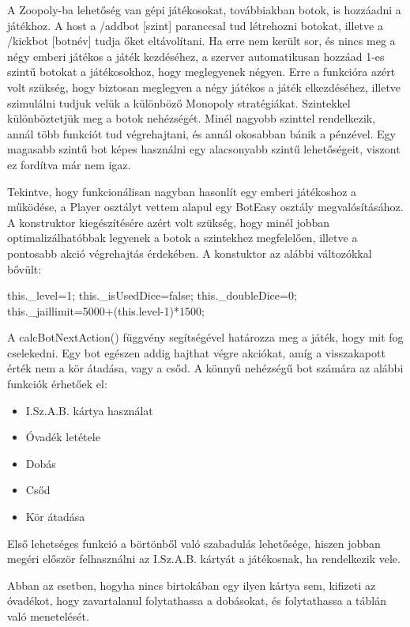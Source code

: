 
A Zoopoly-ba lehetőség van gépi játékosokat, továbbiakban botok, is hozzáadni a játékhoz. A host a /addbot [szint] paranccsal tud létrehozni botokat, illetve a /kickbot [botnév] tudja őket eltávolítani. Ha erre nem került sor, és nincs meg a négy emberi játékos a játék kezdéséhez, a szerver automatikusan hozzáad 1-es szintű botokat a játékosokhoz, hogy meglegyenek négyen. Erre a funkcióra azért volt szükség, hogy biztosan meglegyen a négy játékos a játék elkezdéséhez, illetve szimulálni tudjuk velük a különböző Monopoly stratégiákat. Szintekkel különböztetjük meg a botok nehézségét. Minél nagyobb szinttel rendelkezik, annál több funkciót tud végrehajtani, és annál okosabban bánik a pénzével. Egy magasabb szintű bot képes használni egy alacsonyabb szintű lehetőségeit, viszont ez fordítva már nem igaz.


Tekintve, hogy funkcionálisan nagyban hasonlít egy emberi játékoshoz a működése, a Player osztályt vettem alapul egy BotEasy osztály megvalósításához. A konstruktor kiegészítésére azért volt szükség, hogy minél jobban optimalizálhatóbbak legyenek a botok a szintekhez megfelelően, illetve a pontosabb akció végrehajtás érdekében.  A konstuktor az alábbi változókkal bővült:

\begin{javascript}
	this._level=1;
        this._isUsedDice=false;
        this._doubleDice=0;
        this._jaillimit=5000+(this.level-1)*1500;
\end{javascript}

A calcBotNextAction() függvény segítségével határozza meg a játék, hogy mit fog cselekedni. Egy bot egészen addig hajthat végre akciókat, amíg a visszakapott érték nem a kör átadása, vagy a csőd. A könnyű nehézségű bot számára az alábbi funkciók érhetőek el:
\newpage
\begin{itemize}
\item I.Sz.A.B. kártya használat
\item Óvadék letétele
\item Dobás
\item Csőd
\item Kör átadása
\end{itemize}

Első lehetséges funkció a börtönből való szabadulás lehetősége, hiszen jobban megéri először felhasználni az I.Sz.A.B. kártyát a játékosnak, ha rendelkezik vele.

Abban az esetben, hogyha nincs birtokában egy ilyen kártya sem, kifizeti az óvadékot, hogy zavartalanul folytathassa a dobásokat, és folytathassa a táblán való menetelését.

